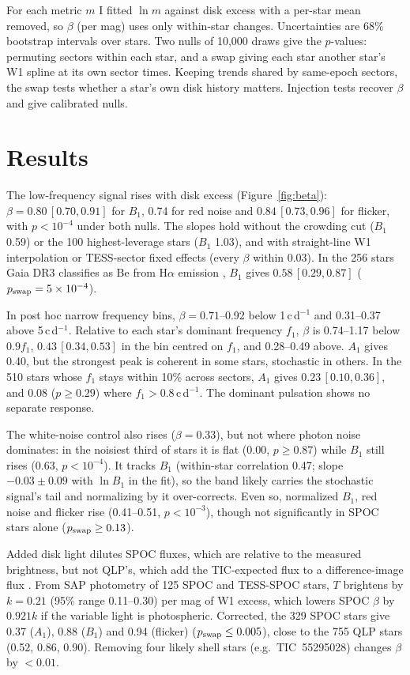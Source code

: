 \documentclass{aastex701}
\begin{document}
For each metric $m$ I fitted $\ln m$ against disk excess with a per-star mean removed, so
$\beta$ (per mag) uses only within-star changes. Uncertainties are 68\% bootstrap intervals
over stars. Two nulls of 10,000 draws give the $p$-values: permuting sectors within each star, and a swap
giving each star another star's W1 spline at its own sector times.
Keeping trends shared by same-epoch sectors, the swap tests whether a star's own disk
history matters. Injection tests recover $\beta$ and give
calibrated nulls.

\section{Results}

The low-frequency signal rises with disk excess (Figure~\ref{fig:beta}): $\beta=0.80\,[0.70,0.91]$
for $B_1$, 0.74 for red noise and $0.84\,[0.73,0.96]$ for flicker, with $p<10^{-4}$ under both
nulls. The slopes hold without
the crowding cut ($B_1$ 0.59) or the 100 highest-leverage stars ($B_1$ 1.03), and
with straight-line W1 interpolation or TESS-sector fixed effects (every $\beta$ within 0.03). In the 256
stars Gaia DR3 classifies as Be from H$\alpha$ emission
\citep{Creevey2023}, $B_1$ gives $0.58\,[0.29,0.87]$ ($p_{\rm swap}=5\times10^{-4}$).

In post hoc narrow frequency bins, $\beta=0.71$--0.92 below 1\,c\,d$^{-1}$ and
0.31--0.37 above 5\,c\,d$^{-1}$. Relative to each star's dominant frequency $f_1$, $\beta$ is
0.74--1.17 below $0.9f_1$, $0.43\,[0.34,0.53]$ in the bin centred on $f_1$, and 0.28--0.49 above.
$A_1$ gives 0.40, but the strongest peak is coherent in some stars, stochastic in others. In the 510 stars whose $f_1$ stays within 10\% across sectors, $A_1$
gives $0.23\,[0.10,0.36]$, and 0.08 ($p\geq0.29$) where $f_1>0.8$\,c\,d$^{-1}$. The dominant pulsation shows
no separate response.

The white-noise control also rises ($\beta=0.33$), but not where photon noise dominates: in
the noisiest third of stars it is flat (0.00, $p\geq0.87$) while $B_1$ still rises (0.63,
$p<10^{-4}$). It tracks $B_1$ (within-star correlation 0.47; slope
$-0.03\pm0.09$ with $\ln B_1$ in the fit), so the band likely carries the stochastic signal's
tail and normalizing by it over-corrects. Even so, normalized $B_1$, red noise and flicker rise
(0.41--0.51, $p<10^{-3}$), though not significantly in SPOC stars alone ($p_{\rm swap}\geq0.13$).

Added disk light dilutes SPOC fluxes, which are relative to the measured brightness, but not
QLP's, which add the TIC-expected flux to a difference-image flux \citep{Huang2020}. From SAP photometry of 125 SPOC and TESS-SPOC stars, $T$
brightens by $k=0.21$ (95\% range 0.11--0.30) per mag of W1 excess, which lowers SPOC
$\beta$ by $0.921k$ if the variable light is photospheric. Corrected, the 329 SPOC stars give 0.37
($A_1$), 0.88 ($B_1$) and 0.94 (flicker) ($p_{\rm swap}\leq0.005$), close to the 755 QLP
stars (0.52, 0.86, 0.90). Removing four likely shell stars (e.g.\ TIC~55295028) changes $\beta$ by $<0.01$.
\end{document}
